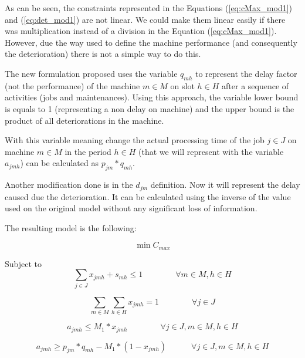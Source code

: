 \documentclass[a4paper,11pt]{article}
\begin{document}
As can be seen, the constraints represented in the Equations (\ref{eq:cMax_mod1}) and (\ref{eq:det_mod1}) are not linear. We could make them linear easily if there was multiplication instead of a division in the Equation (\ref{eq:cMax_mod1}). However, due the way used to define the machine performance (and consequently the deterioration) there is not a simple way to do this.

The new formulation proposed uses the variable $q_{mh}$ to represent the delay factor (not the performance) of the machine $m \in M$ on slot $h \in H$ after a sequence of activities (jobs and maintenances). Using this approach, the variable lower bound is equals to 1 (representing a non delay on machine) and the upper bound is the product of all deteriorations in the machine. 

With this variable meaning change the actual processing time of the job $j \in J$ on machine $m \in M$ in the period $h \in H$ (that we will represent with the variable $a_{jmh}$) can be calculated as $p_{jm}*q_{mh}$. 

Another modification done is in the $d_{jm}$ definition. Now it will represent the delay caused due the deterioration. It can be calculated using the inverse of the value used on the original model without any significant loss of information.   

The resulting model is the following: 

\begin{equation}\label{eq:fo_mod2}
	\min C_{max}
\end{equation}

Subject to
\begin{equation}\label{eq:uniqueAct_mod2}	
 \sum_{j \in J}{x_{jmh}} +  s_{mh} \leq 1 \quad\quad\quad\quad \forall m \in M, h \in H 
\end{equation}

\begin{equation}\label{eq:mandJob_mod2}
	\sum_{m \in M}\sum_{h \in H}{x_{jmh}} = 1 \quad\quad\quad\quad \forall j \in J
\end{equation}

\begin{equation}\label{eq:procTime1_mod2}
	a_{jmh} \leq M_1*x_{jmh} \quad \quad \quad \quad \forall j \in J, m \in M, h \in H
\end{equation}

\begin{equation}\label{eq:procTime2_mod2}
	a_{jmh} \geq p_{jm}*q_{mh} - M_1*(1-x_{jmh}) \quad \quad \quad \forall j \in J, m \in M, h \in H
\end{equation}
\end{document}
